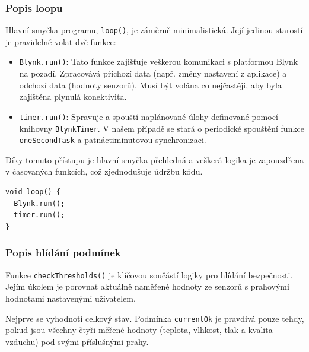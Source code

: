 \documentclass[12pt, twoside]{article} %
\begin{document}
\subsubsection{Popis loopu}
Hlavní smyčka programu, \texttt{loop()}, je záměrně minimalistická. Její jedinou starostí je pravidelně volat dvě funkce:
\begin{itemize}
    \item \texttt{Blynk.run()}: Tato funkce zajišťuje veškerou komunikaci s platformou Blynk na pozadí. Zpracovává příchozí data (např. změny nastavení z aplikace) a odchozí data (hodnoty senzorů). Musí být volána co nejčastěji, aby byla zajištěna plynulá konektivita.
    \item \texttt{timer.run()}: Spravuje a spouští naplánované úlohy definované pomocí knihovny \texttt{BlynkTimer}. V našem případě se stará o periodické spouštění funkce \texttt{oneSecondTask} a patnáctiminutovou synchronizaci.
\end{itemize}
Díky tomuto přístupu je hlavní smyčka přehledná a veškerá logika je zapouzdřena v časovaných funkcích, což zjednodušuje údržbu kódu.
\begin{lstlisting}
void loop() {
  Blynk.run();
  timer.run();
}
\end{lstlisting}

\subsubsection{Popis hlídání podmínek}
Funkce \texttt{checkThresholds()} je klíčovou součástí logiky pro hlídání bezpečnosti. Jejím úkolem je porovnat aktuálně naměřené hodnoty ze senzorů s prahovými hodnotami nastavenými uživatelem.

Nejprve se vyhodnotí celkový stav. Podmínka \texttt{currentOk} je pravdivá pouze tehdy, pokud jsou všechny čtyři měřené hodnoty (teplota, vlhkost, tlak a kvalita vzduchu) pod svými příslušnými prahy.
\end{document}
